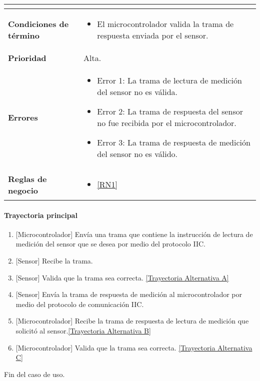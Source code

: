 \begin{longtable}{|J{5cm}|J{10.3cm}|}
\begin{itemize}
		\end{itemize} \\ \hline
	\textbf{Condiciones de término} & 
		\begin{itemize}
		    \item El microcontrolador valida la trama de respuesta enviada por el sensor.
		\end{itemize} 
		\\ \hline 
	\textbf{Prioridad} & 
		Alta. \\ \hline
	\textbf{Errores} &
		 \begin{itemize}
		 	\item \label{SUB-M-CU1.3:Error1} Error 1: La trama de lectura de medición del sensor no es válida.
		 	\item \label{SUB-M-CU1.3:Error2} Error 2: La trama de respuesta del sensor no fue recibida por el microcontrolador.
		 	\item \label{SUB-M-CU1.3:Error3} Error 3: La trama de respuesta de medición del sensor no es válido.
		 \end{itemize} \\ \hline
	\textbf{Reglas de negocio} & 
	    \begin{itemize}
	      \item  \ref{RN1}
		 \end{itemize}\\ \hline
\end{longtable}

\paragraph{Trayectoria principal}
\label{SUB-M-CU1.3:TP}
	\begin{enumerate}
	    \item {[Microcontrolador]} Envía una trama que contiene la instrucción de lectura de medición del sensor que se desea por medio del protocolo IIC.
	    \item {[Sensor]} Recibe la trama.
	    \item {[Sensor]} Valida que la trama sea correcta. \hyperref[SUB-M-CU1.3:TA]{[Trayectoria Alternativa A]} %
		\item {[Sensor]} Envía la trama de respuesta de medición al microcontrolador por medio del protocolo de comunicación IIC.
		\item {[Microcontrolador]} Recibe la trama de respuesta de lectura de medición que solicitó al sensor.\hyperref[SUB-M-CU1.3:TB]{[Trayectoria Alternativa B]} %
		\item {[Microcontrolador]} Valida que la trama sea correcta. \hyperref[SUB-M-CU1.3:TC]{[Trayectoria Alternativa C]}%
	\end{enumerate}
	Fin del caso de uso.

